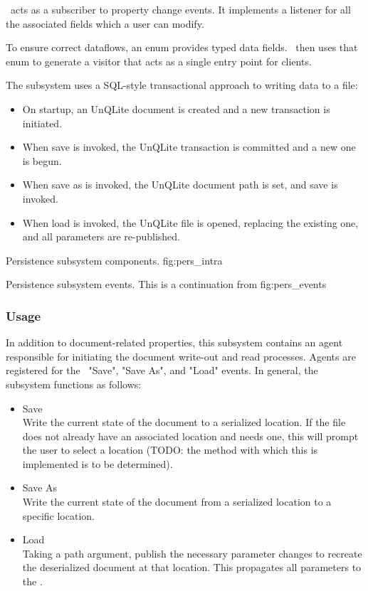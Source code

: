\perftype\ acts as a subscriber to property change events.
It implements a listener for all the associated fields which a user can modify.

To ensure correct dataflows, an enum provides typed data fields.
\permod\ then uses that enum to generate a visitor that acts as a single entry point for clients.

The subsystem uses a SQL-style transactional approach to writing data to a file:
\begin{itemize}
      \item On startup, an UnQLite document is created and a new transaction is initiated.
      \item When save is invoked, the UnQLite transaction is committed and a new one is begun.
      \item When save as is invoked, the UnQLite document path is set, and save is invoked.
      \item When load is invoked, the UnQLite file is opened, replacing the existing one, and all parameters are re-published.
\end{itemize}


{Persistence subsystem components.}
{fig:pers_intra}

{Persistence subsystem events.  This is a continuation from }
{fig:pers_events}


\subsubsection{Usage}
In addition to document-related properties, this subsystem contains an agent responsible for initiating the document write-out and read processes.
Agents are registered for the \uimod\ "Save", "Save As", and "Load" events.
In general, the subsystem functions as follows:
\begin{itemize}
      \item Save \\
            Write the current state of the document to a serialized location.
            If the file does not already have an associated location and needs one, this will prompt the user to select a location (TODO: the method with which this is implemented is to be determined).
      \item Save As \\
            Write the current state of the document from a serialized location to a specific location.
      \item Load \\
            Taking a path argument, publish the necessary parameter changes to recreate the deserialized document at that location.
            This propagates all parameters to the \docftype.
\end{itemize}